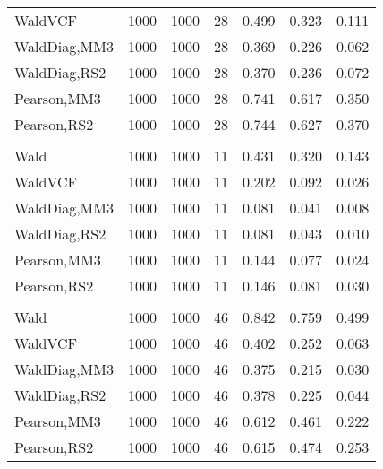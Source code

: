\documentclass[
]{article}
\begin{document}
\begin{table}[H]
{\begin{tabular}[t]{lrrrrrr}
\hspace{1em}WaldVCF & 1000 & 1000 & 28 & 0.499 & 0.323 & 0.111\\
\hspace{1em}WaldDiag,MM3 & 1000 & 1000 & 28 & 0.369 & 0.226 & 0.062\\
\hspace{1em}WaldDiag,RS2 & 1000 & 1000 & 28 & 0.370 & 0.236 & 0.072\\
\hspace{1em}Pearson,MM3 & 1000 & 1000 & 28 & 0.741 & 0.617 & 0.350\\
\hspace{1em}Pearson,RS2 & 1000 & 1000 & 28 & 0.744 & 0.627 & 0.370\\
\addlinespace[0.3em]
\multicolumn{7}{l}{\textbf{2F 10V}}\\
\hspace{1em}Wald & 1000 & 1000 & 11 & 0.431 & 0.320 & 0.143\\
\hspace{1em}WaldVCF & 1000 & 1000 & 11 & 0.202 & 0.092 & 0.026\\
\hspace{1em}WaldDiag,MM3 & 1000 & 1000 & 11 & 0.081 & 0.041 & 0.008\\
\hspace{1em}WaldDiag,RS2 & 1000 & 1000 & 11 & 0.081 & 0.043 & 0.010\\
\hspace{1em}Pearson,MM3 & 1000 & 1000 & 11 & 0.144 & 0.077 & 0.024\\
\hspace{1em}Pearson,RS2 & 1000 & 1000 & 11 & 0.146 & 0.081 & 0.030\\
\addlinespace[0.3em]
\multicolumn{7}{l}{\textbf{3F 15V}}\\
\hspace{1em}Wald & 1000 & 1000 & 46 & 0.842 & 0.759 & 0.499\\
\hspace{1em}WaldVCF & 1000 & 1000 & 46 & 0.402 & 0.252 & 0.063\\
\hspace{1em}WaldDiag,MM3 & 1000 & 1000 & 46 & 0.375 & 0.215 & 0.030\\
\hspace{1em}WaldDiag,RS2 & 1000 & 1000 & 46 & 0.378 & 0.225 & 0.044\\
\hspace{1em}Pearson,MM3 & 1000 & 1000 & 46 & 0.612 & 0.461 & 0.222\\
\hspace{1em}Pearson,RS2 & 1000 & 1000 & 46 & 0.615 & 0.474 & 0.253\\
\bottomrule
\end{tabular}}
\endgroup{}
\end{table}
\end{document}
